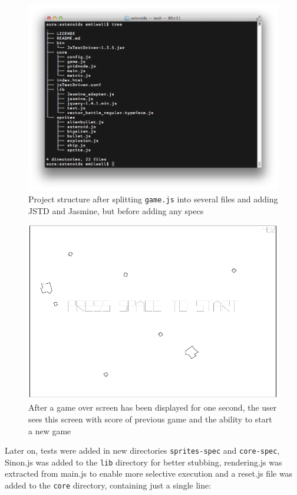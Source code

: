 \documentclass[11pt]{article}
\begin{document}
\begin{figure}[ht!]
\centering
\includegraphics[width=1.0\textwidth]{pics/tree.png}
\caption{Project structure after splitting \texttt{game.js} into several files and adding JSTD and Jasmine, but before adding any specs}
\label{fig:tree}
\end{figure}

\begin{figure}[H]
\centering
\includegraphics[width=1.0\textwidth]{pics/game6.png}
\caption{After a game over screen has been displayed for one second, the user sees this screen with score of previous game and the ability to start a new game}
\label{fig:game6}
\end{figure}

Later on, tests were added in new directories \texttt{sprites-spec} and \texttt{core-spec}, Sinon.js was added to the \texttt{lib} directory for better stubbing, rendering.js was extracted from main.js to enable more selective execution and a reset.js file was added to the \texttt{core} directory, containing just a single line:
\end{document}
